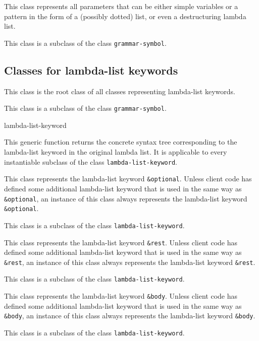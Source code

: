 This class represents all parameters that can be either simple
variables or a pattern in the form of a (possibly dotted) list, or
even a destructuring lambda list.

This class is a subclass of the class \texttt{grammar-symbol}.

\subsection{Classes for lambda-list keywords}


This class is the root class of all classes representing lambda-list
keywords.

This class is a subclass of the class \texttt{grammar-symbol}.

 {lambda-list-keyword}

This generic function returns the concrete syntax tree corresponding
to the lambda-list keyword in the original lambda list.  It is
applicable to every instantiable subclass of the class
\texttt{lambda-list-keyword}.


This class represents the lambda-list keyword \texttt{\&optional}.
Unless client code has defined some additional lambda-list keyword
that is used in the same way as \texttt{\&optional}, an instance of
this class always represents the lambda-list keyword
\texttt{\&optional}.

This class is a subclass of the class \texttt{lambda-list-keyword}.


This class represents the lambda-list keyword \texttt{\&rest}.
Unless client code has defined some additional lambda-list keyword
that is used in the same way as \texttt{\&rest}, an instance of
this class always represents the lambda-list keyword
\texttt{\&rest}.

This class is a subclass of the class \texttt{lambda-list-keyword}.


This class represents the lambda-list keyword \texttt{\&body}.
Unless client code has defined some additional lambda-list keyword
that is used in the same way as \texttt{\&body}, an instance of
this class always represents the lambda-list keyword
\texttt{\&body}.

This class is a subclass of the class \texttt{lambda-list-keyword}.

